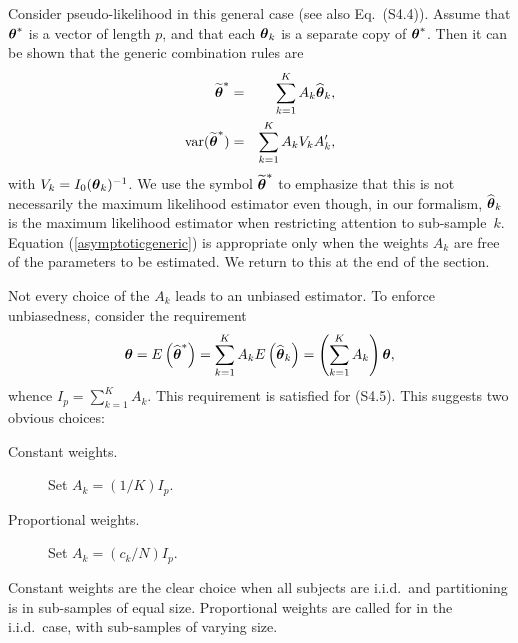 \documentclass[11pt,a5paper,twoside]{book}
\newcommand{\bftheta}{\mbox{\boldmath $\theta$}}
\begin{document}
Consider pseudo-likelihood  in this general case (see also Eq.~(S4.4)).
Assume that $\bftheta^\ast$ is a vector of length $p$, and that 
each $\bftheta_k$ is a separate copy of $\bftheta^\ast$. Then 
it can be shown that the generic combination 
rules are 
\begin{eqnarray}
\label{schattergeneric}
\widetilde{\bftheta}^*&=&\sum_{k=1}^KA_k\widehat{\bftheta}_k,\\
\label{asymptoticgeneric}
\mbox{var}(\widetilde{\bftheta}^*)&=&\sum_{k=1}^KA_kV_kA_k',
\end{eqnarray}
with
$V_k=I_0({\bftheta}_k)^{-1}$. We use the symbol $\widetilde{\bftheta}^*$ to emphasize that this is not necessarily the maximum likelihood estimator even though, in our formalism, $\widehat{\bftheta}_k$ is the maximum likelihood estimator when restricting attention to sub-sample~$k$. 
Equation (\ref{asymptoticgeneric}) is appropriate only when the weights 
$A_k$ are free of the parameters to be estimated. We return to this at 
the end of the section.

Not every choice of the $A_k$ leads to an unbiased estimator. To enforce 
unbiasedness, consider the requirement
$$\bftheta=E\left(\widehat{\bftheta}^*\right)=\sum_{k=1}^KA_kE\left(\widehat{\bftheta}_k\right)=
\left(\sum_{k=1}^KA_k\right)\bftheta,$$
whence $I_p=\sum_{k=1}^KA_k$. This requirement is satisfied for (S4.5).
This suggests two obvious choices:
\begin{description}
\item[Constant weights.] Set $A_k=(1/K)I_{p}$.
\item[Proportional weights.] Set $A_k=(c_k/N)I_p$.
\end{description}
Constant weights are the clear choice when all subjects are i.i.d.\ 
and partitioning is in sub-samples of equal size. Proportional weights 
are called for in the i.i.d.\ case,  with sub-samples of varying size.
\end{document}
